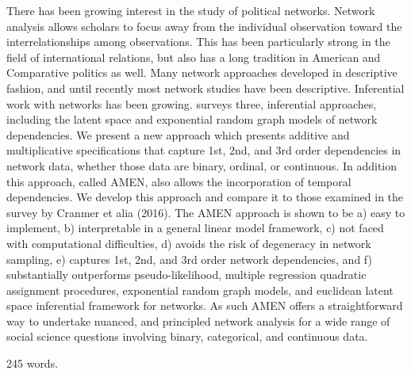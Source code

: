 There has been growing interest in the study of political networks. Network analysis allows scholars to focus away from the individual observation toward the interrelationships among observations. This has been particularly strong in the field of international relations, but also has a long tradition in American and Comparative politics as well.  Many network approaches developed in descriptive fashion, and until recently most network studies have been descriptive. Inferential work with networks has been growing.   \citet{cranmer:etal:2016} surveys three, inferential approaches, including the latent space and exponential random graph models of network dependencies.  We present a new approach which presents additive and multiplicative specifications that capture 1st, 2nd, and 3rd order dependencies in network data, whether those data are binary, ordinal, or continuous. In addition this approach, called AMEN,  also allows the incorporation of temporal dependencies.  We develop this approach and compare it to those examined in the survey by Cranmer et alia (2016).  The AMEN approach is shown to be a) easy to implement, b) interpretable in a general linear model framework, c) not faced with computational difficulties, d) avoids the risk of degeneracy in network sampling, e) captures 1st, 2nd, and 3rd order network dependencies, and f) substantially outperforms pseudo-likelihood, multiple regression quadratic assignment procedures, exponential random graph models, and euclidean latent space inferential framework for networks. As such AMEN offers a straightforward way to undertake nuanced, and principled network analysis for a wide range of social science questions involving binary, categorical, and continuous data. 

245 words.